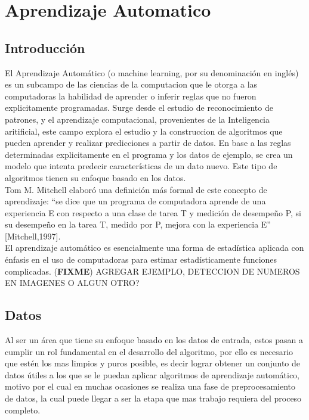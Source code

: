 \documentclass[a4paper,11pt,spanish]{book}
\newcommand*{\FIXME}[1]{{(\textbf{FIXME}) {#1}}}
\begin{document}
  \section{Aprendizaje Automatico}
    \subsection{Introducción}
      El Aprendizaje Automático (o machine learning, por su denominación en inglés) es un subcampo de las ciencias de la computacion que le otorga a las computadoras la habilidad de aprender o inferir reglas que no fueron explicitamente programadas.
      Surge desde el estudio de reconocimiento de patrones, y el aprendizaje computacional, provenientes de la Inteligencia aritificial, este campo explora el estudio y la construccion de algoritmos
      que pueden aprender y realizar predicciones a partir de datos. En base a las reglas determinadas explicitamente en el programa y los datos de ejemplo, se crea un modelo que intenta predecir
      características de un dato nuevo. Este tipo de algoritmos tienen su enfoque basado en los datos.\\
      Tom M. Mitchell elaboró una definición más formal de este concepto de aprendizaje: “se dice que un programa de computadora aprende de una experiencia E con respecto a una clase 
      de tarea T y medición de desempeño P, si su desempeño en la tarea T, medido por P, mejora con la experiencia E” [Mitchell,1997].\\
      El aprendizaje automático es esencialmente una forma de estadística aplicada con énfasis en el uso de computadoras para estimar estadísticamente funciones complicadas.
      \FIXME{AGREGAR EJEMPLO, DETECCION DE NUMEROS EN IMAGENES O ALGUN OTRO?}
      
    \subsection{Datos}
      Al ser un área que tiene su enfoque basado en los datos de entrada, estos pasan a cumplir un rol fundamental en el desarrollo del algoritmo, por ello es necesario que 
      estén los mas limpios y puros posible, es decir lograr obtener un conjunto de datos útiles a los que se le puedan aplicar algoritmos de aprendizaje automático, 
      motivo por el cual en muchas ocasiones se realiza una fase de preprocesamiento de datos, la cual puede llegar a ser la etapa que mas trabajo requiera del proceso completo. 
\end{document}
